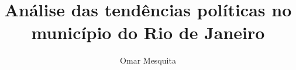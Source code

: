 \documentclass{article}
\begin{document}
 

	\title{Análise das tendências políticas no município do Rio de Janeiro}
	\author{Omar Mesquita}
	\date{} 
	\maketitle
\end{document}
